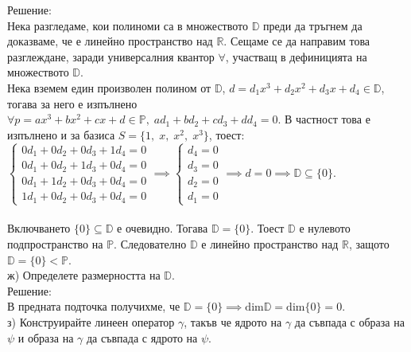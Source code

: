 \documentclass[12pt]{article}
\newcommand{\R}{\mathbb{R}}
\begin{document}
Решение: \\

Нека разгледаме, кои полиноми са в множеството $\mathbb{D}$
преди да тръгнем да доказваме, че е линейно пространство над $\R$.
Сещаме се да направим това разглеждане, заради универсалния квантор $\forall$,
участващ в дефиницията на множеството $\mathbb{D}$. \\

Нека вземем един произволен полином от $\mathbb{D}$,
$d = d_1x^3 + d_2x^2 + d_3x + d_4 \in \mathbb{D}$,
тогава за него е изпълнено $\forall p = ax^3 + bx^2 + cx + d \in \mathbb{P}, \; ad_1 + bd_2 + cd_3 + dd_4 = 0$.
В частност това е изпълнено и за базиса $S = \{1, \; x, \; x^2, \; x^3\}$, тоест: \\

$\begin{cases}
    0d_1 + 0d_2 + 0d_3 + 1d_4 = 0 \\
    0d_1 + 0d_2 + 1d_3 + 0d_4 = 0 \\
    0d_1 + 1d_2 + 0d_3 + 0d_4 = 0 \\
    1d_1 + 0d_2 + 0d_3 + 0d_4 = 0
\end{cases} \implies \begin{cases}
    d_4 = 0 \\
    d_3 = 0 \\
    d_2 = 0 \\
    d_1 = 0
\end{cases} \implies d = 0 \implies \mathbb{D} \subseteq \{0\}$. \\\\

Включването $\{0\} \subseteq \mathbb{D}$ е очевидно. Тогава $\mathbb{D} = \{0\}$.
Тоест $\mathbb{D}$ е нулевото подпространство на $\mathbb{P}$.
Следователно $\mathbb{D}$ е линейно пространство над $\R$, защото $\mathbb{D} = \{0\} < \mathbb{P}$. \\

ж) Определете размерността на $\mathbb{D}$. \\

Решение: \\

В предната подточка получихме, че $\mathbb{D} = \{0\} \implies \mathrm{dim}\mathbb{D} = \mathrm{dim}\{0\} = 0$. \\

з) Конструирайте линеен оператор $\gamma$, такъв че
ядрото на $\gamma$ да съвпада с образа на $\psi$ и 
образа на $\gamma$ да съвпада с ядрото на $\psi$. \\
\end{document}
